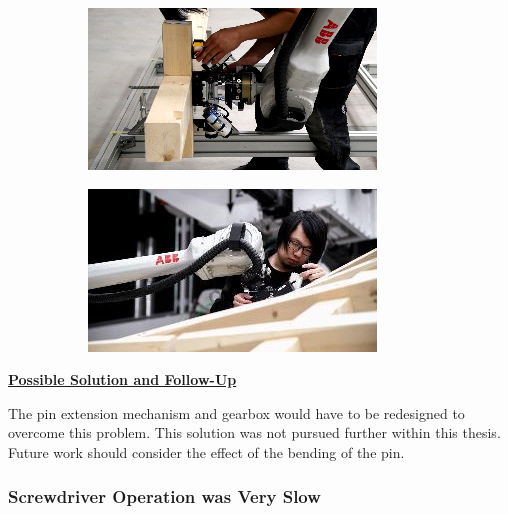 \documentclass[11pt]{book}
\begin{document}
\begin{figure}[H]
\centering
\begin{subfigure}[b]{0.45\textwidth}
\centering
\includegraphics[width=\textwidth]{./images/image107.png}
\end{subfigure}
\hfill
\begin{subfigure}[b]{0.45\textwidth}
\centering
\includegraphics[width=\textwidth]{./images/image108.jpeg}
\end{subfigure}
\end{figure}


\textbf{\uline{Possible Solution and Follow-Up}}

The pin extension mechanism and gearbox would have to be redesigned to overcome this problem. This solution was not pursued further within this thesis. Future work should consider the effect of the bending of the pin.

\subsubsection{Screwdriver Operation was Very Slow}
\end{document}
